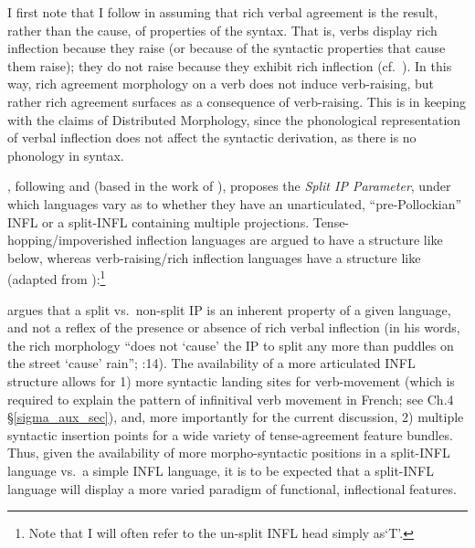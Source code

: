 I first note that I follow \citet{bobaljik2000b} in assuming that rich verbal agreement is the result, rather than the cause, of properties of the syntax. That is, verbs display rich inflection because they raise (or because of the syntactic properties that cause them raise); they do not raise because they exhibit rich inflection (cf.\ ). In this way, rich agreement morphology on a verb does not induce verb-raising, but rather rich agreement surfaces as a consequence of verb-raising. This is in keeping with the claims of Distributed Morphology, since the phonological representation of verbal inflection does not affect the syntactic derivation, as there is no phonology in syntax.

\citet{bobaljik2000b}, following \citet{bobaljik_thrainsson1998} and \citet{johnson1990} (based in the work of ), proposes the {\it Split IP Parameter}, under which languages vary as to whether they have an unarticulated, ``pre-Pollockian'' INFL or a split-INFL containing multiple projections. Tense-hopping/impoverished inflection languages are argued to have a structure like \Next[a] below, whereas verb-raising/rich inflection languages have a structure like \Next[b] (adapted from ):\footnote{Note that I will often refer to the un-split INFL head simply as`T'.}

\singlespacing
\begin{quote}
\begin{samepage}
\q{}

\begin{quote}
\qtreecentertrue
\end{quote}
\end{samepage}
\end{quote}
\onehalfspacing
\citeauthor{bobaljik2000b} argues that a split vs.\ non-split IP is an inherent property of a given language, and not a reflex of the presence or absence of rich verbal inflection (in his words, the rich morphology ``does not `cause' the IP to split any more than puddles on the street `cause' rain''; :14). The availability of a more articulated INFL structure allows for 1) more syntactic landing sites for verb-movement (which is required to explain the pattern of infinitival verb movement in French; see Ch.4 \S\ref{sigma_aux_sec}), and, more importantly for the current discussion, 2) multiple syntactic insertion points for a wide variety of tense-agreement feature bundles. Thus, given the availability of more morpho-syntactic positions in a split-INFL language vs.\ a simple INFL language, it is to be expected that a split-INFL language will display a more varied paradigm of functional, inflectional features.

